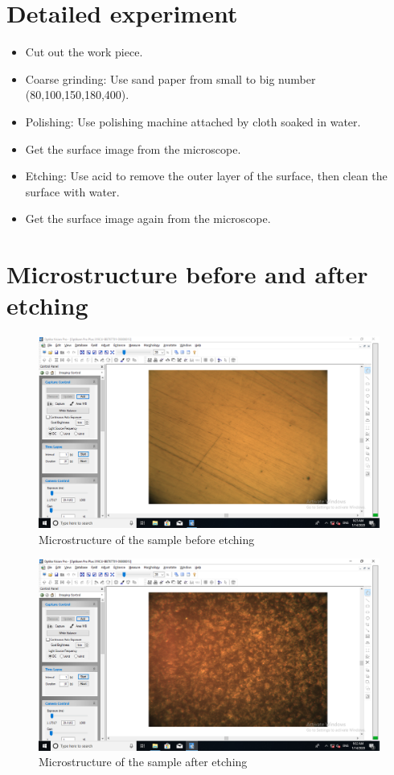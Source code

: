 \section{Detailed experiment}
\begin{itemize}
	\item Cut out the work piece.
	\item Coarse grinding: Use sand paper from small to big number (80,100,150,180,400).
	\item Polishing: Use polishing machine attached by cloth soaked in water.
	\item Get the surface image from the microscope.
	\item Etching: Use acid to remove the outer layer of the surface, then clean the surface with water.
	\item Get the surface image again from the microscope.
\end{itemize}

\section{Microstructure before and after etching}
\begin{figure}[ht]
	\centering
	\includegraphics[width=150mm]{1852158-1852269.png}
	\caption{Microstructure of the sample before etching}
\end{figure}
\begin{figure}[ht]
	\centering
	\includegraphics[width=150mm]{1852158-1852269-2.png}
	\caption{Microstructure of the sample after etching}
\end{figure}

